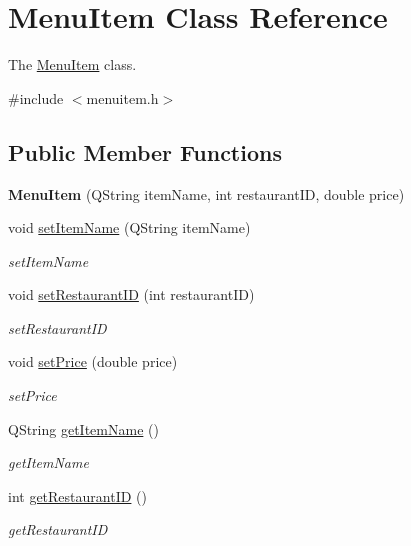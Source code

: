 \hypertarget{class_menu_item}{}\section{Menu\+Item Class Reference}
\label{class_menu_item}


The \hyperlink{class_menu_item}{Menu\+Item} class.  




{\ttfamily \#include $<$menuitem.\+h$>$}

\subsection*{Public Member Functions}
\begin{DoxyCompactItemize}
\item 
\mbox{\label{class_menu_item_ace4fef81d61df85c799b17027b83f3ab}} 
{\bfseries Menu\+Item} (Q\+String item\+Name, int restaurant\+ID, double price)
\item 
void \hyperlink{class_menu_item_abc651e3a5656b7fbb0e72085b8adab0e}{set\+Item\+Name} (Q\+String item\+Name)
\begin{DoxyCompactList}\small\item\em set\+Item\+Name \end{DoxyCompactList}\item 
void \hyperlink{class_menu_item_a046acac8a4f20c6d3589ac34bb53ea71}{set\+Restaurant\+ID} (int restaurant\+ID)
\begin{DoxyCompactList}\small\item\em set\+Restaurant\+ID \end{DoxyCompactList}\item 
void \hyperlink{class_menu_item_ae2ebb751e94c46e5bbe32dc2f8003919}{set\+Price} (double price)
\begin{DoxyCompactList}\small\item\em set\+Price \end{DoxyCompactList}\item 
Q\+String \hyperlink{class_menu_item_a4d6f0c0ce06292a95521c2f01c360393}{get\+Item\+Name} ()
\begin{DoxyCompactList}\small\item\em get\+Item\+Name \end{DoxyCompactList}\item 
int \hyperlink{class_menu_item_acb28f30d43a514d5f4e9598b5c6f3f60}{get\+Restaurant\+ID} ()
\begin{DoxyCompactList}\small\item\em get\+Restaurant\+ID \end{DoxyCompactList}\item 

\end{DoxyCompactItemize}
